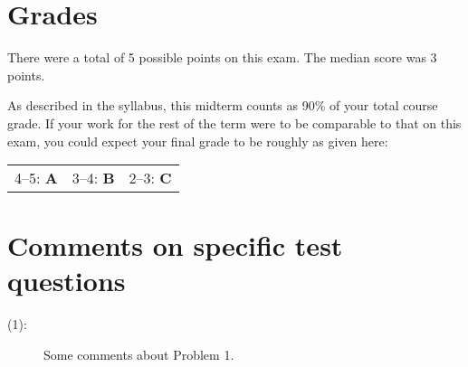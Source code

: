 \documentclass{article}
\begin{document}
\maketitle

\section*{Grades}
There were a total of 5 possible points on this exam.
The median score was 3 points.

As described in the syllabus, this midterm counts as 90\% of your total course grade.
If your work for the rest of the term were to be comparable to that on this exam, you could expect your final grade to be roughly as given here:

\begin{center}
  \begin{tabular}[h]{c c c}
    4--5: \textbf{A} &
    3--4: \textbf{B} &
    2--3: \textbf{C}
  \end{tabular}
\end{center}

\section*{Comments on specific test questions}
\begin{description}
\item[(1):]
  Some comments about Problem 1.
\end{description}
\end{document}
